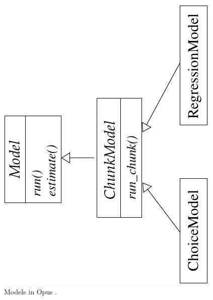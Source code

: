 {\begin{figure}
\begin{center}
\includegraphics[scale=0.8, angle=-90]{images/coremodelswithmethods.pdf}
\caption{\label{fig:opus-core-model}\small Models in Opus .}
\end{center}
\end{figure}

}
